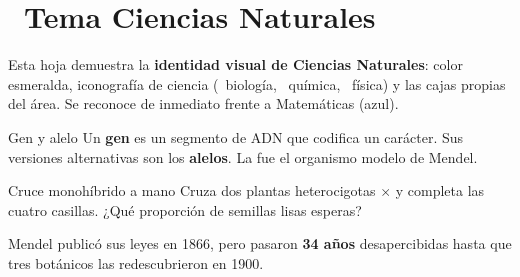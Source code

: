 

\renewcommand{\hdrcapitulo}{Ciencias Naturales · Muestra del tema}
\printmodefalse



\section{\icogen\ Tema Ciencias Naturales}

Esta hoja demuestra la \textbf{identidad visual de Ciencias Naturales}:
color esmeralda, iconografía de ciencia (\icobio\ biología, \icoquim\ química,
\icofis\ física) y las cajas propias del área. Se reconoce de inmediato frente a
Matemáticas (azul).

\begin{definicion}{Gen y alelo}
Un \textbf{gen} es un segmento de ADN que codifica un carácter. Sus versiones
alternativas son los \textbf{alelos}. La  fue el
organismo modelo de Mendel.
\end{definicion}

\begin{laboratorio}{Cruce monohíbrido a mano}
Cruza dos plantas heterocigotas  $\times$  y completa
las cuatro casillas. ¿Qué proporción de semillas lisas esperas?
\begin{center}
\end{center}
\end{laboratorio}

\begin{sabias}
Mendel publicó sus leyes en 1866, pero pasaron \textbf{34 años} desapercibidas
hasta que tres botánicos las redescubrieron en 1900.
\end{sabias}

\filetehoja


